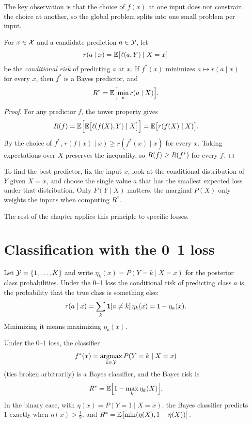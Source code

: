 \begin{notechapter}
The key observation is that the choice of $f(x)$ at one input does not
constrain the choice at another, so the global problem splits into one small
problem per input.

\begin{theorem}\label{bayes-decision-theory:thm:pointwise}
For $x \in \mathcal{X}$ and a candidate prediction $a \in \mathcal{Y}$, let
\[
  r(a \mid x) = \mathbb{E}\bigl[\ell(a, Y) \mid X = x\bigr]
\]
be the \emph{conditional risk} of predicting $a$ at $x$. If $f^*(x)$ minimizes
$a \mapsto r(a\mid x)$ for every $x$, then $f^*$ is a Bayes predictor, and
\[
  R^* = \mathbb{E}\Bigl[\min_{a} r(a \mid X)\Bigr].
\]
\end{theorem}

\begin{proof}
For any predictor $f$, the tower property gives
\[
  R(f) = \mathbb{E}\Bigl[\mathbb{E}\bigl[\ell(f(X), Y)\mid X\bigr]\Bigr] = \mathbb{E}\bigl[r(f(X)\mid X)\bigr].
\]
By the choice of $f^*$, $r(f(x)\mid x) \geq r(f^*(x)\mid x)$ for every $x$.
Taking expectations over $X$ preserves the inequality, so
$R(f) \geq R(f^*)$ for every $f$.
\end{proof}

\begin{keyidea}
To find the best predictor, fix the input $x$, look at the conditional
distribution of $Y$ given $X = x$, and choose the single value $a$ that has
the smallest expected loss under that distribution. Only $P(Y\mid X)$ matters;
the marginal $P(X)$ only weights the inputs when computing $R^*$.
\end{keyidea}

The rest of the chapter applies this principle to specific losses.

\section{Classification with the 0--1 loss}\label{bayes-decision-theory:sec:01}

Let $\mathcal{Y} = \{1, \dots, K\}$ and write
$\eta_k(x) = P(Y = k \mid X = x)$ for the posterior class probabilities.
Under the 0--1 loss the conditional risk of predicting class $a$ is the
probability that the true class is something else:
\[
  r(a \mid x) = \sum_{k} \mathbf{1}[a \neq k]\, \eta_k(x) = 1 - \eta_a(x).
\]
Minimizing it means maximizing $\eta_a(x)$.

\begin{theorem}\label{bayes-decision-theory:thm:bayes-classifier}
Under the 0--1 loss, the classifier
\[
  f^*(x) = \operatorname*{argmax}_{k \in \mathcal{Y}} P(Y = k \mid X = x)
\]
(ties broken arbitrarily) is a Bayes classifier, and the Bayes risk is
\[
  R^* = \mathbb{E}\Bigl[1 - \max_k \eta_k(X)\Bigr].
\]
In the binary case, with $\eta(x) = P(Y=1\mid X=x)$, the Bayes classifier
predicts $1$ exactly when $\eta(x) > \frac12$, and $R^* = \mathbb{E}\bigl[\min(\eta(X), 1-\eta(X))\bigr]$.
\end{theorem}


\end{notechapter}
